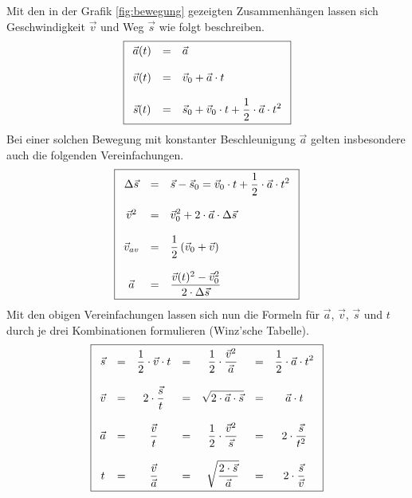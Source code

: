 \noindent
Mit den in der Grafik \ref{fig:bewegung} gezeigten Zusammenhängen lassen
sich Geschwindigkeit $\vec{v}$ und Weg $\vec{s}$ wie folgt beschreiben.
\[ \boxed{\begin{array}{c c l} 
	\vec{a}(t) 	&=& \displaystyle
		\vec{a} \\
	& \\
	\vec{v}(t)	&=& \displaystyle 
		\vec{v}_0+\vec{a}\cdot t \\
	& \\
	\vec{s}(t) 	&=& \displaystyle 
		\vec{s}_0+\vec{v}_0\cdot t+\frac{1}{2}\cdot\vec{a}\cdot t^2
\end{array}}\]
Bei einer solchen Bewegung mit konstanter Beschleunigung $\vec{a}$ gelten
insbesondere auch die folgenden Vereinfachungen.
\[ \boxed{\begin{array}{c c l}
	\Delta \vec{s}	&=& \displaystyle
		\vec{s}-\vec{s}_0 = \displaystyle
		\vec{v}_0\cdot t+\frac{1}{2}\cdot \vec{a}\cdot t^2 \\
	& \\
	\vec{v}^2 	&=& \displaystyle
		\vec{v}_{0}^{2}+2\cdot\vec{a} \cdot \Delta \vec{s} \\
	& \\
	\vec{v}_{av} &=& \displaystyle
		\frac{1}{2} \left( \vec{v}_0 + \vec{v} \right) \\
	& \\
	\vec{a} 	&=& \displaystyle
		\frac{\vec{v}(t)^2-\vec{v}_0^2}{2\cdot\Delta \vec{s}} 
\end{array}}\]
Mit den obigen Vereinfachungen lassen sich nun die Formeln für 
$\vec{a}$, $\vec{v}$, $\vec{s}$ und $t$ durch je drei
Kombinationen formulieren (Winz'sche Tabelle).
\[ \boxed{\begin{array}{c c c c c c c}
	\vec{s}	
		&=& \displaystyle 
			\frac{1}{2} \cdot \vec{v} \cdot t
		&=& \displaystyle 
			\frac{1}{2} \cdot \frac{\vec{v}^2}{\vec{a}}
		&=& \displaystyle 
			\frac{1}{2} \cdot \vec{a} \cdot t^2 \\
	& & & & & & \\
	\vec{v} 
		&=& \displaystyle 
			2 \cdot \frac{\vec{s}}{t}
		&=& \displaystyle 
			\sqrt{2 \cdot \vec{a} \cdot \vec{s}}
		&=& \displaystyle 
			\vec{a} \cdot t \\
	& & & & & & \\
	\vec{a}
		&=& \displaystyle 
			\frac{\vec{v}}{t} 
		&=& \displaystyle 
			\frac{1}{2} \cdot \frac{\vec{v}^2}{\vec{s}}
		&=& \displaystyle 
			2 \cdot \frac{\vec{s}}{t^2} \\
	& & & & & & \\
	t 	
		&=& \displaystyle 
			\frac{\vec{v}}{\vec{a}}
		&=& \displaystyle 
			\sqrt{\frac{2 \cdot \vec{s}}{\vec{a}}}
		&=& \displaystyle 
			2 \cdot \frac{\vec{s}}{\vec{v}}
\end{array}}\]

